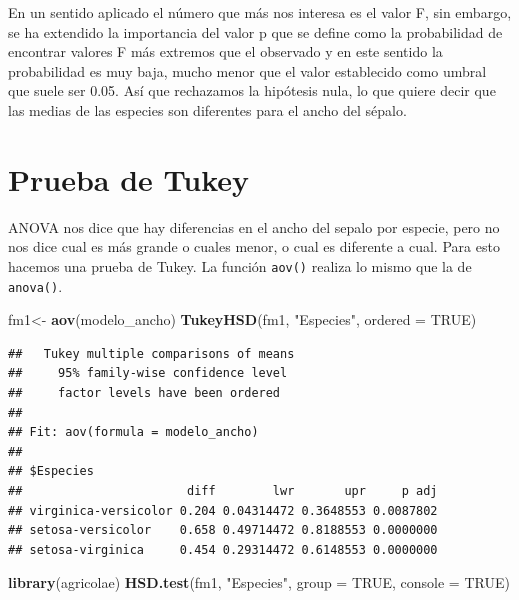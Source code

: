\documentclass[
]{book}
\newenvironment{Shaded}{\begin{snugshade}}{\end{snugshade}}
\newcommand{\AttributeTok}[1]{\textcolor[rgb]{0.13,0.29,0.53}{#1}}
\newcommand{\ConstantTok}[1]{\textcolor[rgb]{0.56,0.35,0.01}{#1}}
\newcommand{\FunctionTok}[1]{\textcolor[rgb]{0.13,0.29,0.53}{\textbf{#1}}}
\newcommand{\NormalTok}[1]{#1}
\newcommand{\OtherTok}[1]{\textcolor[rgb]{0.56,0.35,0.01}{#1}}
\newcommand{\StringTok}[1]{\textcolor[rgb]{0.31,0.60,0.02}{#1}}
\begin{document}
En un sentido aplicado el número que más nos interesa es el valor F, sin embargo, se ha extendido la importancia del valor p que se define como la probabilidad de encontrar valores F más extremos que el observado y en este sentido la probabilidad es muy baja, mucho menor que el valor establecido como umbral que suele ser 0.05.
Así que rechazamos la hipótesis nula, lo que quiere decir que las medias de las especies son diferentes para el ancho del sépalo.

\section{Prueba de Tukey}\label{prueba-de-tukey}

ANOVA nos dice que hay diferencias en el ancho del sepalo por especie, pero no nos dice cual es más grande o cuales menor, o cual es diferente a cual.
Para esto hacemos una prueba de Tukey.
La función \texttt{aov()} realiza lo mismo que la de \texttt{anova()}.\\

\begin{Shaded}
\begin{Highlighting}[]
\NormalTok{fm1}\OtherTok{\textless{}{-}} \FunctionTok{aov}\NormalTok{(modelo\_ancho)}
\FunctionTok{TukeyHSD}\NormalTok{(fm1, }\StringTok{"Especies"}\NormalTok{, }\AttributeTok{ordered =} \ConstantTok{TRUE}\NormalTok{)}
\end{Highlighting}
\end{Shaded}

\begin{verbatim}
##   Tukey multiple comparisons of means
##     95% family-wise confidence level
##     factor levels have been ordered
## 
## Fit: aov(formula = modelo_ancho)
## 
## $Especies
##                       diff        lwr       upr     p adj
## virginica-versicolor 0.204 0.04314472 0.3648553 0.0087802
## setosa-versicolor    0.658 0.49714472 0.8188553 0.0000000
## setosa-virginica     0.454 0.29314472 0.6148553 0.0000000
\end{verbatim}

\hfill\break

\begin{Shaded}
\begin{Highlighting}[]
\FunctionTok{library}\NormalTok{(agricolae)}
\FunctionTok{HSD.test}\NormalTok{(fm1, }\StringTok{"Especies"}\NormalTok{, }\AttributeTok{group =} \ConstantTok{TRUE}\NormalTok{, }\AttributeTok{console =} \ConstantTok{TRUE}\NormalTok{)}
\end{Highlighting}
\end{Shaded}
\end{document}
